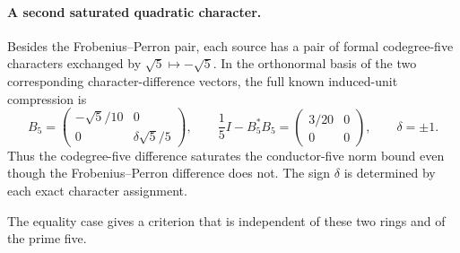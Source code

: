 \paragraph{A second saturated quadratic character.}
Besides the Frobenius--Perron pair, each source has a pair of formal
codegree-five characters exchanged by $\sqrt5\mapsto-\sqrt5$.
In the orthonormal basis of the two corresponding character-difference
vectors, the full known induced-unit compression is
\[
 B_5=\begin{pmatrix}-\sqrt5/10&0\\0&\delta\sqrt5/5\end{pmatrix},
 \qquad \frac15I-B_5^*B_5=
 \begin{pmatrix}3/20&0\\0&0\end{pmatrix},\qquad \delta=\pm1.
\]
Thus the codegree-five difference saturates the conductor-five norm
bound even though the Frobenius--Perron difference does not.  The sign
$\delta$ is determined by each exact character assignment.

The equality case gives a criterion that is independent of these two
rings and of the prime five.

